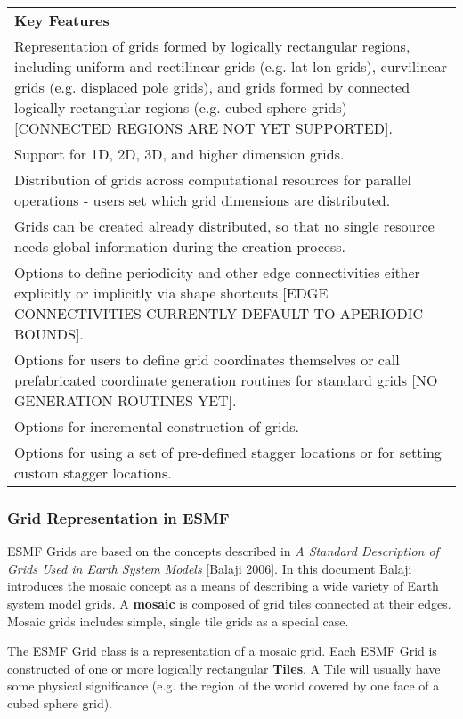 \begin{center}
\begin{tabular}{|p{6in}|}
\hline
\vspace{.01in}
{\bf Key Features} \\[.01in]
Representation of grids formed by logically rectangular regions,
including uniform and rectilinear grids (e.g. lat-lon grids),
curvilinear grids (e.g. displaced pole grids), and grids formed
by connected logically rectangular regions (e.g. cubed sphere grids)
[CONNECTED REGIONS ARE NOT YET SUPPORTED].\\
Support for 1D, 2D, 3D, and higher dimension grids.\\ 
Distribution of grids across computational resources for parallel
operations - users set which grid dimensions are distributed.\\
Grids can be created already distributed, so that no single
resource needs global information during the creation process.\\
Options to define periodicity and other edge connectivities either 
explicitly or implicitly via shape shortcuts [EDGE CONNECTIVITIES
CURRENTLY DEFAULT TO APERIODIC BOUNDS].\\ 
Options for users to define grid coordinates themselves or call
prefabricated coordinate generation routines for standard grids
[NO GENERATION ROUTINES YET].\\
Options for incremental construction of grids.\\
Options for using a set of pre-defined stagger locations or for setting
custom stagger locations.\\ [.03in] \hline
\end{tabular}
\end{center}

\subsubsection{Grid Representation in ESMF}

ESMF Grids are based on the concepts described in {\it A Standard
Description of Grids Used in Earth System Models} [Balaji 2006].  In this document
Balaji introduces the mosaic concept as a means of describing
a wide variety of Earth system model grids.  A {\bf mosaic} is
composed of grid tiles connected at their edges.  Mosaic grids
includes simple, single tile grids as a special case.  

The ESMF Grid class is a representation of a mosaic grid.  Each ESMF
Grid is constructed of one or more logically rectangular {\bf Tiles}.
A Tile will usually have some physical significance (e.g. the region
of the world covered by one face of a cubed sphere grid).

